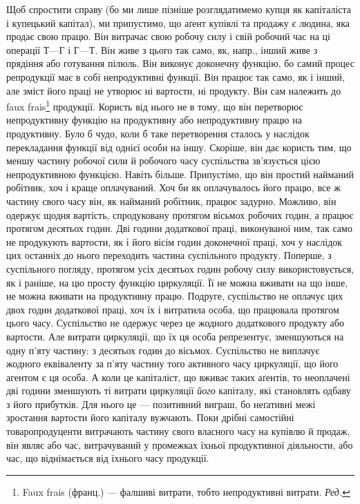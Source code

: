 Щоб спростити справу (бо ми лише пізніше розглядатимемо купця
як капіталіста і купецький капітал), ми припустимо, що аґент купівлі та
продажу є людина, яка продає свою працю. Він витрачає свою робочу
силу і свій робочий час на ці операції $Т — Г$ і $Г — Т$. Він живе з цього
так само, як, напр., інший живе з прядіння або готування пілюль. Він
виконує доконечну функцію, бо самий процес репродукції має в собі
непродуктивні функції. Він працює так само, як і інший, але зміст його
праці не утворює ні вартости, ні продукту. Він сам належить до faux
frais\footnote*{
Faux frais (франц.) — фалшиві витрати, тобто непродуктивні витрати. \emph{Ред.}
} продукції. Користь від нього не в тому, що він перетворює
непродуктивну функцію на продуктивну або непродуктивну працю на
продуктивну. Було б чудо, коли б таке перетворення сталось у наслідок
перекладання функції від однієї особи на іншу. Скоріше, він дає користь
тим, що меншу частину робочої сили й робочого часу суспільства
зв’язується цією непродуктивною функцією. Навіть більше. Припустімо,
що він простий найманий робітник, хоч і краще оплачуваний.
Хоч би    як оплачувалось його працю, все ж частину свого часу
він, як    найманий робітник, працює    задурно. Можливо, він
одержує щодня вартість, спродуковану протягом вісьмох робочих годин, а
працює протягом десятьох годин. Дві години додаткової праці, виконуваної
ним, так само не продукують вартости, як і його вісім годин
доконечної праці, хоч у наслідок цих останніх до нього переходить
частина суспільного продукту. Поперше, з суспільного погляду, протягом
усіх десятьох годин робочу силу використовується, як і раніше, на цю
просту функцію циркуляції. Її не можна вживати на що інше, не
можна вживати на продуктивну працю. Подруге, суспільство не оплачує
цих двох годин додаткової праці, хоч їх і витратила особа, що
працювала протягом цього часу. Суспільство не одержує через це жодного
додаткового продукту або вартости. Але витрати циркуляції, що їх
ця особа репрезентує, зменшуються на одну п’яту частину: з десятьох
годин до вісьмох. Суспільство не виплачує жодного еквіваленту за п’яту
частину того активного часу циркуляції, що його агентом є ця особа.
А коли це капіталіст, що вживає таких аґентів, то неоплачені дві години
зменшують ті витрати циркуляції \emph{його} капіталу, які становлять одбаву з його
прибутків. Для нього це — позитивний виграш, бо неґативні межі зростання
вартости його капіталу вужчають. Поки дрібні самостійні товаропродуценти
витрачають частину свого власного часу на купівлю й продаж,
він являє або час, витрачуваний у промежках їхньої продуктивної
діяльности, або час, що віднімається від їхнього часу продукції.

